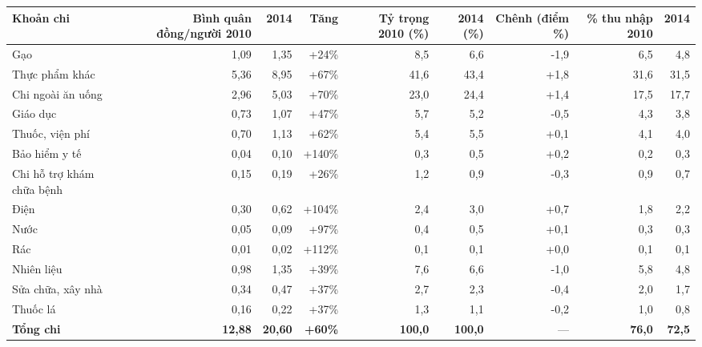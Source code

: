 \begin{tabular}{lrrrrrrrr}
\toprule
Khoản chi & Bình quân đồng/người 2010 & 2014 & Tăng & Tỷ trọng 2010 (\%) & 2014 (\%) & Chênh (điểm \%) & \% thu nhập 2010 & 2014 \\
\midrule
Gạo & 1,09 & 1,35 & +24\% & 8,5 & 6,6 & -1,9 & 6,5 & 4,8 \\
Thực phẩm khác & 5,36 & 8,95 & +67\% & 41,6 & 43,4 & +1,8 & 31,6 & 31,5 \\
Chi ngoài ăn uống & 2,96 & 5,03 & +70\% & 23,0 & 24,4 & +1,4 & 17,5 & 17,7 \\
Giáo dục & 0,73 & 1,07 & +47\% & 5,7 & 5,2 & -0,5 & 4,3 & 3,8 \\
Thuốc, viện phí & 0,70 & 1,13 & +62\% & 5,4 & 5,5 & +0,1 & 4,1 & 4,0 \\
Bảo hiểm y tế & 0,04 & 0,10 & +140\% & 0,3 & 0,5 & +0,2 & 0,2 & 0,3 \\
Chi hỗ trợ khám chữa bệnh & 0,15 & 0,19 & +26\% & 1,2 & 0,9 & -0,3 & 0,9 & 0,7 \\
Điện & 0,30 & 0,62 & +104\% & 2,4 & 3,0 & +0,7 & 1,8 & 2,2 \\
Nước & 0,05 & 0,09 & +97\% & 0,4 & 0,5 & +0,1 & 0,3 & 0,3 \\
Rác & 0,01 & 0,02 & +112\% & 0,1 & 0,1 & +0,0 & 0,1 & 0,1 \\
Nhiên liệu & 0,98 & 1,35 & +39\% & 7,6 & 6,6 & -1,0 & 5,8 & 4,8 \\
Sửa chữa, xây nhà & 0,34 & 0,47 & +37\% & 2,7 & 2,3 & -0,4 & 2,0 & 1,7 \\
Thuốc lá & 0,16 & 0,22 & +37\% & 1,3 & 1,1 & -0,2 & 1,0 & 0,8 \\
\textbf{Tổng chi} & \textbf{12,88} & \textbf{20,60} & \textbf{+60\%} & \textbf{100,0} & \textbf{100,0} & — & \textbf{76,0} & \textbf{72,5} \\
\bottomrule
\end{tabular}
